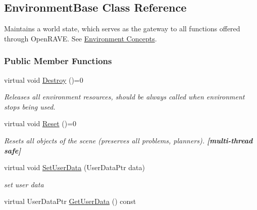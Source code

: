 \hypertarget{classOpenRAVE_1_1EnvironmentBase}{
\subsection{EnvironmentBase Class Reference}
\label{classOpenRAVE_1_1EnvironmentBase}
}


Maintains a world state, which serves as the gateway to all functions offered through OpenRAVE. See \hyperlink{architecture__concepts_arch_environment}{Environment Concepts}.  


\subsubsection*{Public Member Functions}
\begin{DoxyCompactItemize}
\item 
virtual void \hyperlink{classOpenRAVE_1_1EnvironmentBase_a84693792fa8cba90b312c0b1caf53716}{Destroy} ()=0
\begin{DoxyCompactList}\small\item\em Releases all environment resources, should be always called when environment stops being used. \item\end{DoxyCompactList}\item 
virtual void \hyperlink{classOpenRAVE_1_1EnvironmentBase_a43a787400d2a563b9eee1a149225c18a}{Reset} ()=0
\begin{DoxyCompactList}\small\item\em Resets all objects of the scene (preserves all problems, planners). {\bfseries \mbox{[}multi-\/thread safe\mbox{]}} \item\end{DoxyCompactList}\item 
\hypertarget{classOpenRAVE_1_1EnvironmentBase_ab3a2d5e41d756988959d9f5cdccfe284}{
virtual void \hyperlink{classOpenRAVE_1_1EnvironmentBase_ab3a2d5e41d756988959d9f5cdccfe284}{SetUserData} (UserDataPtr data)}
\label{classOpenRAVE_1_1EnvironmentBase_ab3a2d5e41d756988959d9f5cdccfe284}

\begin{DoxyCompactList}\small\item\em set user data \item\end{DoxyCompactList}\item 
\hypertarget{classOpenRAVE_1_1EnvironmentBase_a975ebca32c743c8530807758e7c46618}{
virtual UserDataPtr \hyperlink{classOpenRAVE_1_1EnvironmentBase_a975ebca32c743c8530807758e7c46618}{GetUserData} () const }
\label{classOpenRAVE_1_1EnvironmentBase_a975ebca32c743c8530807758e7c46618}


\end{DoxyCompactItemize}
